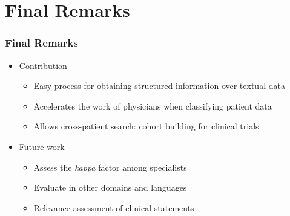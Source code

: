 \section*{Final Remarks}


\begin{frame}
	\frametitle{Final Remarks}
	\begin{itemize} \myspacing
		\item Contribution
		\begin{itemize}
			\item Easy process for obtaining structured information over textual data
			\item Accelerates the work of physicians when classifying patient data
			\item Allows cross-patient search: cohort building for clinical trials
		\end{itemize}
		\item Future work
		\begin{itemize}
			\item Assess the \emph{kappa} factor among specialists
			\item Evaluate in other domains and languages
			\item Relevance assessment of clinical statements
		\end{itemize}
	\end{itemize}
\end{frame}
